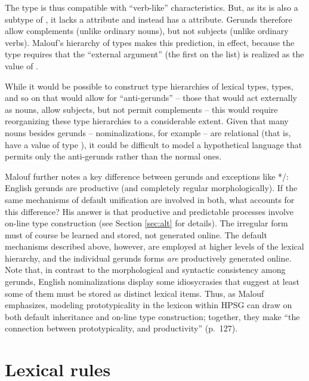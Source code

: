 \documentclass[output=paper
                ,modfonts
                ,nonflat
	        ,collection
	        ,collectionchapter
	        ,collectiontoclongg
 	        ,biblatex
                ,babelshorthands
                ,newtxmath
                ,draftmode
                ,colorlinks, citecolor=brown
]{./langsci/langscibook}
\begin{document}
{The type  is thus compatible with ``verb-like'' characteristics.
But, as its  is also a subtype of , it lacks a  attribute and instead has a  attribute.
Gerunds therefore allow complements (unlike ordinary nouns), but not subjects (unlike ordinary verbs).
Malouf's hierarchy of types makes this prediction, in effect, because the  type requires that the ``external argument'' (the first on the  list) is realized as the value of .

While it would be possible to construct type hierarchies of lexical types,  types, and so on that would allow for ``anti-gerunds'' -- those that would act externally as nouns, allow subjects, but not permit complements -- this would require reorganizing these type hierarchies to a considerable extent.
Given that many nouns besides gerunds -- nominalizations, for example -- are relational (that is, have a  value of type ), it could be difficult to model a hypothetical language that permits only the anti-gerunds rather than the normal ones.

Malouf further notes a key difference between gerunds and exceptions like */: English gerunds are productive (and completely regular morphologically).
If the same mechanisms of default unification are involved in both, what accounts for this difference?
His answer is that productive and predictable processes involve on-line type construction (see Section \ref{sec:alt} for details).
The irregular form  must of course be learned and stored, not generated online.
The default mechanisms described above, however, are employed at higher levels of the lexical hierarchy, and the individual gerunds forms \emph{are} productively generated online.
Note that, in contrast to the morphological and syntactic consistency among gerunds, English nominalizations display some idiosycrasies that suggest at least some of them must be stored as distinct lexical items.
Thus, as Malouf emphasizes, modeling prototypicality in the lexicon within HPSG can draw on both default inheritance and on-line type construction; together, they make ``the connection between prototypicality, and productivity'' (p.\ 127).


\section{Lexical rules}
\label{lexicon-sec-lexical-rules}

}
\end{document}
